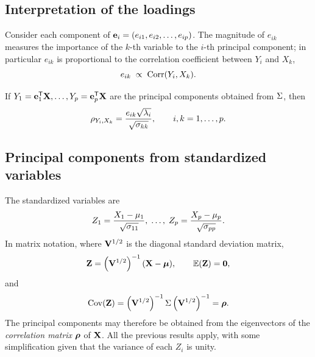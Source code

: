 \subsection{Interpretation of the loadings}
\label{subsec:loadings}

Consider each component of $\mathbf{e}_i=(e_{i1},e_{i2},\dots,e_{ip})$. The
magnitude of $e_{ik}$ measures the importance of the $k$-th variable to the
$i$-th principal component; in particular $e_{ik}$ is proportional to the
correlation coefficient between $Y_i$ and $X_k$,
\[
  e_{ik}\;\propto\;\operatorname{Corr}(Y_i,X_k).
\]

\begin{proposition}
  \label{prop:corr_pc_var}
  If $Y_1=\mathbf{e}_1^{\mathsf{T}}\mathbf{X},\dots,Y_p=\mathbf{e}_p^{\mathsf{T}}\mathbf{X}$ are the principal
  components obtained from $\Sigma$, then
  \begin{equation}
    \label{eq:corr_pc_var}
    \rho_{Y_i,X_k}=\frac{e_{ik}\sqrt{\lambda_i}}{\sqrt{\sigma_{kk}}},
    \qquad i,k=1,\dots,p.
  \end{equation}
\end{proposition}

\subsection{Principal components from standardized variables}
\label{subsec:standardized}

The standardized variables are
\begin{equation}
  \label{eq:standardized_vars}
  Z_1=\frac{X_1-\mu_1}{\sqrt{\sigma_{11}}},\;\dots,\;
  Z_p=\frac{X_p-\mu_p}{\sqrt{\sigma_{pp}}}.
\end{equation}
In matrix notation, where $\mathbf{V}^{1/2}$ is the diagonal standard deviation
matrix,
\begin{equation}
  \label{eq:standardized_matrix}
  \mathbf{Z}=\left( \mathbf{V}^{1/2} \right)^{-1}(\mathbf{X}-\boldsymbol{\mu}),
  \qquad \mathbb{E}(\mathbf{Z})=\mathbf{0},
\end{equation}
and
\begin{equation}
  \label{eq:cov_Z_is_rho}
  \operatorname{Cov}(\mathbf{Z})=\left( \mathbf{V}^{1/2} \right)^{-1}\Sigma\left( \mathbf{V}^{1/2} \right)^{-1}=\boldsymbol{\rho} .
\end{equation}
The principal components may therefore be obtained from the eigenvectors of the
\emph{correlation matrix} $\boldsymbol{\rho}$ of $\mathbf{X}$. All the previous results apply,
with some simplification given that the variance of each $Z_i$ is unity.

